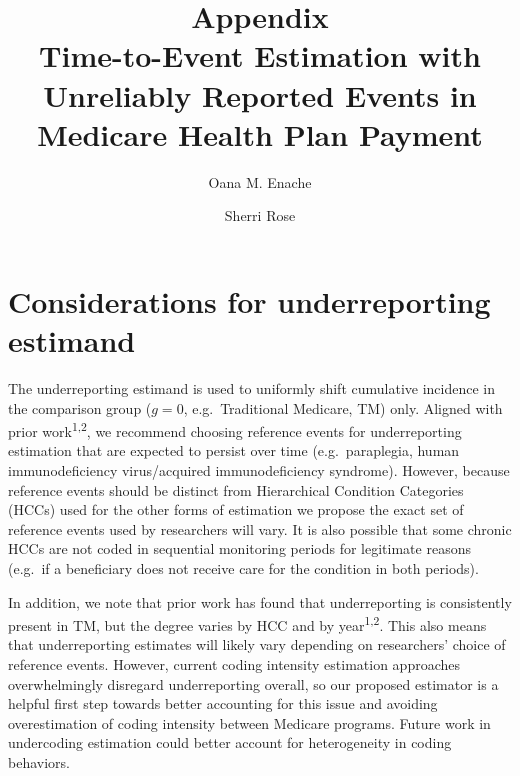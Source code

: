 \documentclass[
  12pt,
  number,
  doubleblind]{elsarticle}
\begin{document}
\begin{frontmatter}
\title{Appendix \\\large{Time-to-Event Estimation with Unreliably
Reported Events in Medicare Health Plan Payment} }
\author[1]{Oana M. Enache%
%
}
\author[2]{Sherri Rose%
%
}





        





\end{frontmatter}
    

\section{Considerations for underreporting
estimand}\label{considerations-for-underreporting-estimand}

The underreporting estimand is used to uniformly shift cumulative
incidence in the comparison group (\(g=0\), e.g.~Traditional Medicare,
TM) only. Aligned with prior work\textsuperscript{1,2}, we recommend
choosing reference events for underreporting estimation that are
expected to persist over time (e.g.~paraplegia, human immunodeficiency
virus/acquired immunodeficiency syndrome). However, because reference
events should be distinct from Hierarchical Condition Categories (HCCs)
used for the other forms of estimation we propose the exact set of
reference events used by researchers will vary. It is also possible that
some chronic HCCs are not coded in sequential monitoring periods for
legitimate reasons (e.g.~if a beneficiary does not receive care for the
condition in both periods).

In addition, we note that prior work has found that underreporting is
consistently present in TM, but the degree varies by HCC and by
year\textsuperscript{1,2}. This also means that underreporting estimates
will likely vary depending on researchers' choice of reference events.
However, current coding intensity estimation approaches overwhelmingly
disregard underreporting overall, so our proposed estimator is a helpful
first step towards better accounting for this issue and avoiding
overestimation of coding intensity between Medicare programs. Future
work in undercoding estimation could better account for heterogeneity in
coding behaviors.
\end{document}
